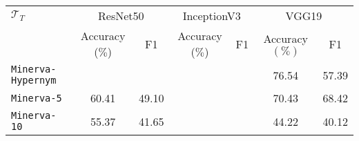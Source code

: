 \begin{tabular}{l|cc|cc|cc} \hline
	$\mathcal{T}_T$ &  \multicolumn{2}{c}{ResNet50} & \multicolumn{2}{|c|}{InceptionV3} & \multicolumn{2}{c}{VGG19}\\
			& Accuracy ($\%$) & F1 & Accuracy ($\%$) & F1 & Accuracy $(\%)$ & F1 \\\hline \hline
	\texttt{Minerva-Hypernym} & \cellcolor{yellow!25}{76.64} & \cellcolor{yellow!25}{58.56} & \cellcolor{green!25}{79.40} & \cellcolor{green!25}{60.07} & 76.54 & 57.39 \\
	\texttt{Minerva-5} & 60.41  & 49.10 & \cellcolor{yellow!25}{72.06} & \cellcolor{yellow!25}{68.89} & 70.43 & 68.42\\
	\texttt{Minerva-10} & 55.37 & 41.65  & \cellcolor{green!25}{60.1} & \cellcolor{green!25}{45.12} & 44.22 & 40.12 \\
\hline
\end{tabular}
